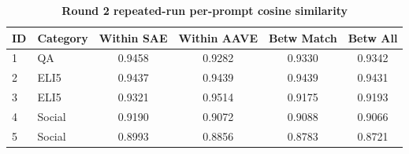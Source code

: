 \begin{table}[htbp]
\centering
\caption{\textbf{Round 2 repeated-run per-prompt cosine similarity}}
\label{tab:round2-repeated-cosine-per-prompt}
\renewcommand{\arraystretch}{1.4}
\begin{tabular}{|l|l|c|c|c|c|}
\hline
\textbf{ID} & \textbf{Category} & \textbf{Within SAE} & \textbf{Within AAVE} & \textbf{Betw Match} & \textbf{Betw All} \\
\hline
1 & QA & 0.9458 & 0.9282 & 0.9330 & 0.9342 \\
\hline
2 & ELI5 & 0.9437 & 0.9439 & 0.9439 & 0.9431 \\
\hline
3 & ELI5 & 0.9321 & 0.9514 & 0.9175 & 0.9193 \\
\hline
4 & Social & 0.9190 & 0.9072 & 0.9088 & 0.9066 \\
\hline
5 & Social & 0.8993 & 0.8856 & 0.8783 & 0.8721 \\
\hline
\end{tabular}
\end{table}

